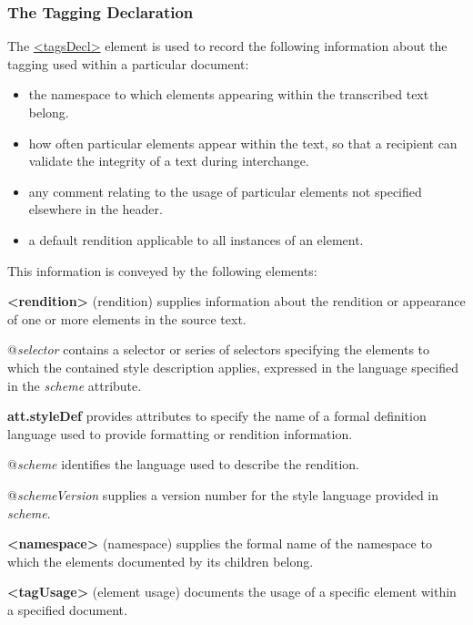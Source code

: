 \subsubsection[{The Tagging Declaration}]{The Tagging Declaration}\label{HD57}\par
The \hyperref[TEI.tagsDecl]{<tagsDecl>} element is used to record the following information about the tagging used within a particular document: \begin{itemize}
\item the namespace to which elements appearing within the transcribed text belong.
\item how often particular elements appear within the text, so that a recipient can validate the integrity of a text during interchange.
\item any comment relating to the usage of particular elements not specified elsewhere in the header.
\item a default rendition applicable to all instances of an element.
\end{itemize} \par
This information is conveyed by the following elements: 
\begin{sansreflist}
  
\item [\textbf{<rendition>}] (rendition) supplies information about the rendition or appearance of one or more elements in the source text.\hfil\\[-10pt]\begin{sansreflist}
    \item[@{\itshape selector}]
  contains a selector or series of selectors specifying the elements to which the contained style description applies, expressed in the language specified in the {\itshape scheme} attribute.
\end{sansreflist}  
\item [\textbf{att.styleDef}] provides attributes to specify the name of a formal definition language used to provide formatting or rendition information.\hfil\\[-10pt]\begin{sansreflist}
    \item[@{\itshape scheme}]
  identifies the language used to describe the rendition.
    \item[@{\itshape schemeVersion}]
  supplies a version number for the style language provided in {\itshape scheme}.
\end{sansreflist}  
\item [\textbf{<namespace>}] (namespace) supplies the formal name of the namespace to which the elements documented by its children belong.
\item [\textbf{<tagUsage>}] (element usage) documents the usage of a specific element within a specified document.
\end{sansreflist}
